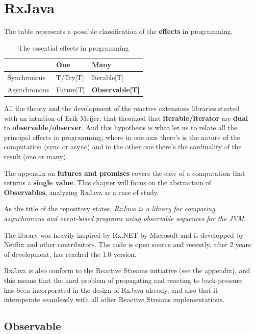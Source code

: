 \section{RxJava}\label{rxjava}

The table represents a possible classification of the
\textbf{effects} in programming.

\begin{table}[]
\centering
\caption{The essential effects in programming}
\label{my-label}
\begin{tabular}{|l|l|l|}
\hline
             & {\bf One}     & {\bf Many}        \\ \hline
Synchronous  & T/Try{[}T{]}  & Iterable{[}T{]}   \\ \hline
Asynchronous & Future{[}T{]} & \textbf{Observable{[}T{]}} \\ \hline
\end{tabular}
\end{table}

All the theory and the development of the reactive extensions libraries
started with an intuition of Erik Meijer, that theorized that
\textbf{iterable/iterator} are \textbf{dual} to
\textbf{observable/observer}. And this hypothesis is what let us to
relate all the principal effects in programming, where in one axis
there's is the nature of the computation (sync or async) and in the
other one there's the cardinality of the result (one or many).

The appendix on \textbf{futures and promises} covers the case of a
computation that returns a \textbf{single value}. This chapter will
focus on the abstraction of \textbf{Observables}, analyzing RxJava as a
case of study.

As the title of the repository states, \emph{RxJava is a library for
composing asynchronous and event-based programs using observable
sequences for the JVM}.

The library was heavily inspired by Rx.NET by Microsoft and is
developped by Netflix and other contributors. The code is open source
and recently, after 2 years of development, has reached the 1.0 version.

RxJava is also conform to the Reactive Streams initiative (see the
appendix), and this means that the hard problem of propagating and
reacting to back-pressure has been incorporated in the design of RxJava
already, and also that it interoperate seamlessly with all other
Reactive Streams implementations.

\subsection{Observable}\label{observable}

